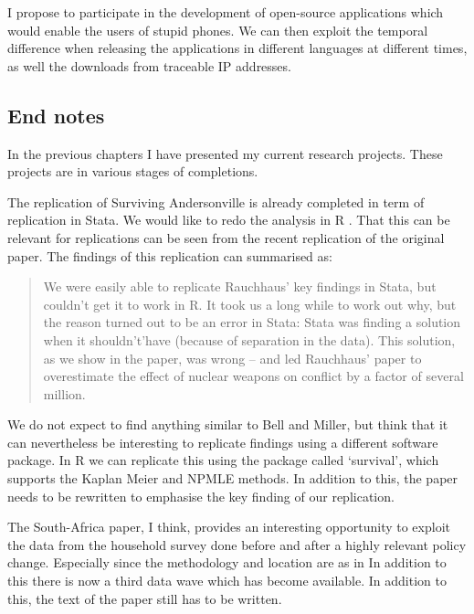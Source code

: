 \documentclass[a4paper]{report}\usepackage{graphicx, color}
\begin{document}
\begin{refsection}
I propose to participate in the development of open-source applications which would enable the users of stupid phones. We can then exploit the temporal difference when releasing the applications in different languages at different times, as well the downloads from traceable IP addresses.

\printbibliography

\end{refsection}

\begin{refsection}
\chapter{End notes}
\label{end-notes}
In the previous chapters I have presented my current research projects. These projects are in various stages of completions.

The replication of Surviving Andersonville is already completed in term of replication in Stata. We would like to redo the analysis in R \parencite{R}. That this can be relevant for replications can be seen from the recent replication \textcite{bell2013questioning} of the original \textcite{rauchhaus2009evaluating} paper. The findings of this replication can summarised as:

\begin{quote}
We were easily able to replicate Rauchhaus’ key findings in Stata, but couldn't get it to work in R. It took us a long while to work out why, but the reason turned out to be an error in Stata: Stata was finding a solution when it shouldn’t'have (because of separation in the data). This solution, as we show in the paper, was wrong – and led Rauchhaus’ paper to overestimate the effect of nuclear weapons on conflict by a factor of several million.
\end{quote}

We do not expect to find anything similar to Bell and Miller, but think that it can nevertheless be interesting to replicate findings using a different software package. In R we can replicate this using the package called `survival', which supports the Kaplan Meier and NPMLE methods. In addition to this, the paper needs to be rewritten to emphasise the key finding of our replication.

The South-Africa paper, I think, provides an interesting opportunity to exploit the data from the household survey done before and after a highly relevant policy change. Especially since the methodology and location are as in \textcite{duflo2000, duflo2003} In addition to this there is now a third data wave which has become available. In addition to this, the text of the paper still has to be written. 


\end{refsection}
\end{document}
